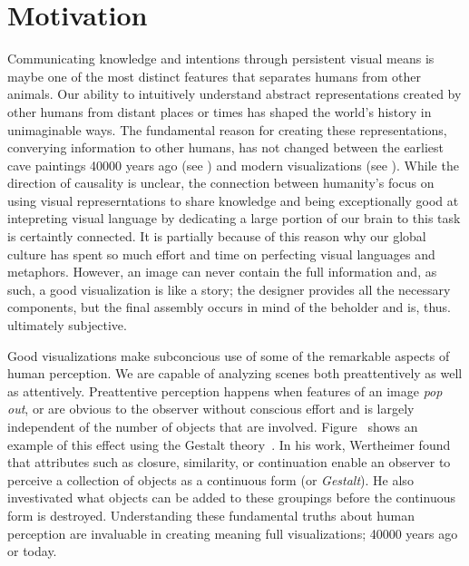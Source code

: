 \chapter{Motivation} \label{cha:motivation}
Communicating knowledge and intentions through persistent visual means is maybe one of the most distinct features that separates humans from other animals.  Our ability to intuitively understand abstract representations created by other humans from distant places or times has shaped the world's history in unimaginable ways.  The fundamental reason for creating these representations, converying information to other humans, has not changed between the earliest cave paintings 40000 years ago (see ) and modern visualizations (see ).  While the direction of causality is unclear, the connection between humanity's focus on using visual represerntations to share knowledge and being exceptionally good at intepreting visual language by dedicating a large portion of our brain to this task is certaintly connected.  It is partially because of this reason why our global culture has spent so much effort and time on perfecting visual languages and metaphors.  However, an image can never contain the full information and, as such, a good visualization is like a story;  the designer provides all the necessary components, but the final assembly occurs in mind of the beholder and is, thus. ultimately subjective.

Good visualizations make subconcious use of some of the remarkable aspects of human perception.  We are capable of analyzing scenes both preattentively as well as attentively.  Preattentive perception happens when features of an image \emph{pop out}, or are obvious to the observer without conscious effort and is largely independent of the number of objects that are involved.  Figure~ shows an example of this effect using the Gestalt theory~\cite{wertheimer1922untersuchungen}.  In his work, Wertheimer found that attributes such as closure, similarity, or continuation enable an observer to perceive a collection of objects as a continuous form (or \emph{Gestalt}).  He also investivated what objects can be added to these groupings before the continuous form is destroyed.  Understanding these fundamental truths about human perception are invaluable in creating meaning full visualizations;  40000 years ago or today.

